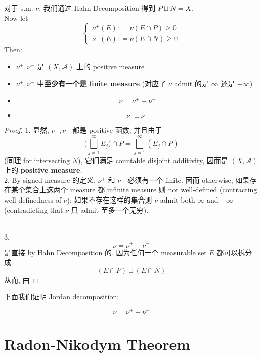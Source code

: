 \documentclass[lang=cn,11pt]{elegantbook}
\begin{document}
\begin{lemma}
对于 s.m. $\nu$, 我们通过 Hahn Decomposition 得到 $P \sqcup N = X$.\\
Now let $$\begin{cases}
    \nu^+ (E)  : = \nu(E \cap P) \geq 0 \\
    \nu^- (E) : = \nu(E \cap N) \geq 0
\end{cases}$$
Then:
    \begin{itemize}
        \item $\nu^+,\nu^-$ 是 $(X,\mathcal{A})$ 上的 positive measure
        \item $\nu^+,\nu^-$ 中\textbf{至少有一个是 finite measure} (对应了 $\nu$ admit 的是 $\infty$ 还是 $-\infty$)
        \item \[\nu = \nu^+ - \nu^-\]
        \item \[ \nu^+ \bot \,\nu^- \]
    \end{itemize}
\end{lemma}
\begin{proof}
1. 显然, $\nu^+,\nu^-$ 都是 positive 函数, 并且由于 \[
\bigg(\bigsqcup_{j=1}^\infty E_j \bigg)\cap P  =  \bigsqcup_{j=1}^\infty (E_j \cap P)
\]
(同理 for intersecting $N$), 它们满足 countable disjoint additivity, 因而是 $(X,\mathcal{A})$ 上的 \textbf{positive measure}.\\
2. By signed measure 的定义, $\nu^+$ 和 $\nu^-$ 必须有一个 finite. 因而 otherwise, 如果存在某个集合上这两个 measure 都 infinite measure 则 not well-defined (contracting well-definedness of $\nu$); 如果不存在这样的集合则 $\nu$ admit both $\infty$ and $-\infty$ (contradicting that $\nu$ 只 admit 至多一个无穷).\\\

3. \[\nu = \nu^+ - \nu^-\] 是直接 by Hahn Decomposition 的. 因为任何一个 measurable set $E$ 都可以拆分成 \[
(E \cap P) \sqcup (E\cap N)
\]
从而, 由
\end{proof}

下面我们证明 Jordan decomposition: 




\[
\nu  = \nu ^+  - \nu^-
\]








\chapter{Radon-Nikodym Theorem}
\end{document}
